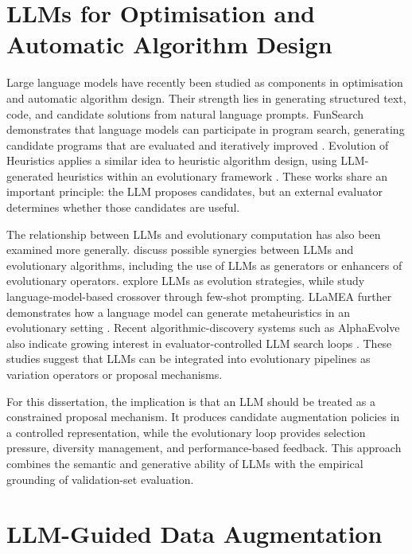 \documentclass[12pt,a4paper]{report}
\begin{document}
\section{LLMs for Optimisation and Automatic Algorithm Design}

Large language models have recently been studied as components in optimisation and automatic algorithm design. Their strength lies in generating structured text, code, and candidate solutions from natural language prompts. FunSearch demonstrates that language models can participate in program search, generating candidate programs that are evaluated and iteratively improved \citep{romera2024funsearch}. Evolution of Heuristics applies a similar idea to heuristic algorithm design, using LLM-generated heuristics within an evolutionary framework \citep{liu2024eoh}. These works share an important principle: the LLM proposes candidates, but an external evaluator determines whether those candidates are useful.

The relationship between LLMs and evolutionary computation has also been examined more generally. \citet{wang2024llmea} discuss possible synergies between LLMs and evolutionary algorithms, including the use of LLMs as generators or enhancers of evolutionary operators. \citet{lange2024llmes} explore LLMs as evolution strategies, while \citet{meyerson2024lmcrossover} study language-model-based crossover through few-shot prompting. LLaMEA further demonstrates how a language model can generate metaheuristics in an evolutionary setting \citep{stein2024llamea}. Recent algorithmic-discovery systems such as AlphaEvolve also indicate growing interest in evaluator-controlled LLM search loops \citep{novikov2025alphaevolve}. These studies suggest that LLMs can be integrated into evolutionary pipelines as variation operators or proposal mechanisms.

For this dissertation, the implication is that an LLM should be treated as a constrained proposal mechanism. It produces candidate augmentation policies in a controlled representation, while the evolutionary loop provides selection pressure, diversity management, and performance-based feedback. This approach combines the semantic and generative ability of LLMs with the empirical grounding of validation-set evaluation.

\section{LLM-Guided Data Augmentation}
\end{document}
